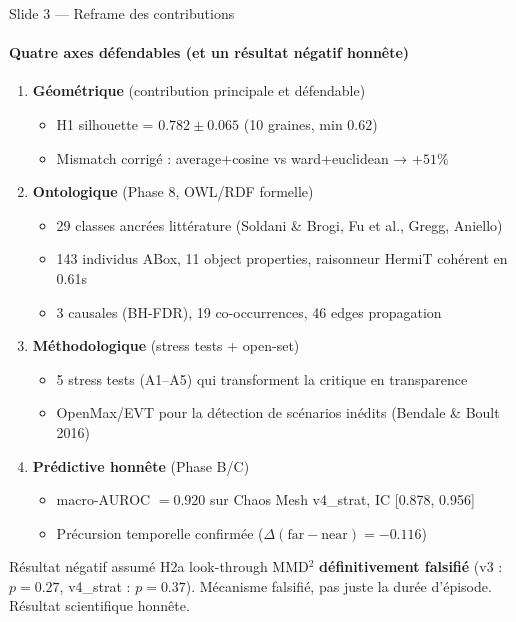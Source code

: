 \documentclass[10pt,aspectratio=169]{beamer}
\begin{document}
\begin{frame}{Slide 3 --- Reframe des contributions}
  \framesubtitle{Quatre axes défendables (et un résultat négatif honnête)}

  \begin{enumerate}
    \item \textbf{Géométrique} (contribution principale et défendable)
      \begin{itemize}
        \item H1 silhouette = $0.782 \pm 0.065$ (10 graines, min $0.62$)
        \item Mismatch corrigé : average+cosine vs ward+euclidean → $+51\%$
      \end{itemize}

    \item \textbf{Ontologique} (Phase 8, OWL/RDF formelle)
      \begin{itemize}
        \item 29 classes ancrées littérature (Soldani \& Brogi, Fu et al., Gregg, Aniello)
        \item 143 individus ABox, 11 object properties, raisonneur HermiT cohérent en 0.61s
        \item 3 causales (BH-FDR), 19 co-occurrences, 46 edges propagation
      \end{itemize}

    \item \textbf{Méthodologique} (stress tests + open-set)
      \begin{itemize}
        \item 5 stress tests (A1--A5) qui transforment la critique en transparence
        \item OpenMax/EVT pour la détection de scénarios inédits (Bendale \& Boult 2016)
      \end{itemize}

    \item \textbf{Prédictive honnête} (Phase B/C)
      \begin{itemize}
        \item macro-AUROC $= \mathbf{0.920}$ sur Chaos Mesh v4\_strat, IC [0.878, 0.956]
        \item Précursion temporelle confirmée ($\Delta(\text{far}-\text{near})=-0.116$)
      \end{itemize}
  \end{enumerate}

  \vspace{0.4em}
  \begin{block}{Résultat négatif assumé}
    \scriptsize H2a look-through MMD$^2$ \textbf{définitivement falsifié}
    (v3 : $p = 0.27$, v4\_strat : $p = 0.37$). Mécanisme falsifié, pas juste la
    durée d'épisode. Résultat scientifique honnête.
  \end{block}
\end{frame}
\end{document}
